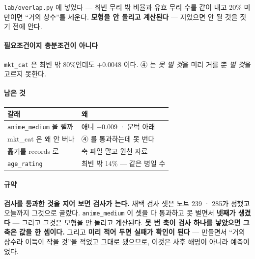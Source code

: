 \documentclass[10pt]{article}
\begin{document}
\texttt{lab/overlap.py} 에 넣었다 --- 최빈 무리 밖 비율과 유효 무리 수를
같이 내고 20\% 미만이면 ``거의 상수''를 세운다. \textbf{모형을 안 돌리고
계산된다} --- 지었으면 안 될 것을 짓기 전에 안다.

\paragraph{필요조건이지 충분조건이 아니다} \texttt{mkt\_cat} 은 최빈 밖
80\%인데도 $+$0.0048 이다. ④ 는 \emph{못 벌 것}을 미리 거를 뿐 \emph{벌
것}을 고르지 못한다.

\paragraph{남은 것}
\begin{center}\small
\begin{tabular}{ll}
\hline
갈래 & 왜 \\
\hline
\texttt{anime\_medium} 을 뺄까 & 애니 $-$0.009 · 문턱 아래 \\
mkt\_cat 은 왜 안 버나 & ④ 를 통과하는데 못 번다 \\
훑기를 records 로 & 축 파일 말고 원천 자료 \\
\texttt{age\_rating} & 최빈 밖 14\% --- 같은 병일 수 \\
\hline
\end{tabular}
\end{center}

\paragraph{규약} \textbf{검사를 통과한 것을 지어 보면 검사가 는다.}
채택 검사 셋은 노트 239 · 285가 정했고 오늘까지 그것으로 골랐다.
\texttt{anime\_medium} 이 셋을 다 통과하고 못 벌면서 \textbf{넷째가 생겼다}
--- 그리고 그것은 모형을 안 돌리고 계산된다. \textbf{못 번 축이 검사 하나를
낳았으면 그 축은 값을 한 셈이다.} 그리고 \textbf{미리 적어 두면 실패가
확인이 된다} --- 만들면서 ``거의 상수라 이득이 작을 것''을 적었고 그대로
됐으므로, 이것은 사후 해명이 아니라 예측이었다.
\end{document}
